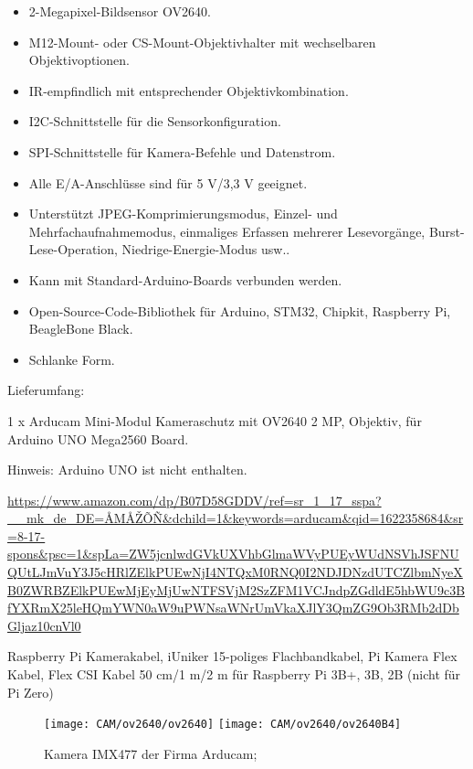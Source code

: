 \begin{itemize}
  \item 2-Megapixel-Bildsensor OV2640.
  \item M12-Mount- oder CS-Mount-Objektivhalter mit wechselbaren Objektivoptionen.
  \item IR-empfindlich mit entsprechender Objektivkombination.
  \item I2C-Schnittstelle für die Sensorkonfiguration.
  \item SPI-Schnittstelle für Kamera-Befehle und Datenstrom.
  \item Alle E/A-Anschlüsse sind für 5 V/3,3 V geeignet.
  \item Unterstützt JPEG-Komprimierungsmodus, Einzel- und Mehrfachaufnahmemodus, einmaliges Erfassen mehrerer Lesevorgänge, Burst-Lese-Operation, Niedrige-Energie-Modus usw..
  \item Kann mit Standard-Arduino-Boards verbunden werden.
  \item Open-Source-Code-Bibliothek für Arduino, STM32, Chipkit, Raspberry Pi, BeagleBone Black.
  \item Schlanke Form.
\end{itemize}

\bigskip

Lieferumfang:

1 x Arducam Mini-Modul Kameraschutz mit OV2640 2 MP, Objektiv, für Arduino UNO Mega2560 Board.

Hinweis: Arduino UNO ist nicht enthalten.

\bigskip


\url{https://www.amazon.com/dp/B07D58GDDV/ref=sr_1_17_sspa?__mk_de_DE=ÅMÅŽÕÑ&dchild=1&keywords=arducam&qid=1622358684&sr=8-17-spons&psc=1&spLa=ZW5jcnlwdGVkUXVhbGlmaWVyPUEyWUdNSVhJSFNUQUtLJmVuY3J5cHRlZElkPUEwNjI4NTQxM0RNQ0I2NDJDNzdUTCZlbmNyeXB0ZWRBZElkPUEwMjEyMjUwNTFSVjM2SzZFM1VCJndpZGdldE5hbWU9c3BfYXRmX25leHQmYWN0aW9uPWNsaWNrUmVkaXJlY3QmZG9Ob3RMb2dDbGljaz10cnVl0}

    
Raspberry Pi Kamerakabel, iUniker 15-poliges Flachbandkabel, Pi Kamera Flex Kabel, Flex CSI Kabel 50 cm/1 m/2 m für Raspberry Pi 3B+, 3B, 2B (nicht für Pi Zero)
    
\begin{figure}
    \begin{center}
        \texttt{[image: CAM/ov2640/ov2640]}
        \quad 
        \texttt{[image: CAM/ov2640/ov2640B4]}
        
        \caption{Kamera IMX477 der Firma Arducam; \cite{Arducam:2021}}
    \end{center}    
\end{figure}



